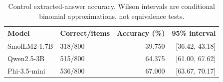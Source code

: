 \begin{table}[tbp]
\centering\small
\caption{Control extracted-answer accuracy. Wilson intervals are conditional binomial approximations, not equivalence tests.}\label{tab:control}
\begin{tabular}{llrr}\toprule
Model & Correct/items & Accuracy (\%) & 95\% interval \\
\midrule
SmolLM2-1.7B & 318/800 & 39.750 & [36.42, 43.18] \\
Qwen2.5-3B & 515/800 & 64.375 & [61.00, 67.62] \\
Phi-3.5-mini & 536/800 & 67.000 & [63.67, 70.17] \\
\bottomrule\end{tabular}
\end{table}
